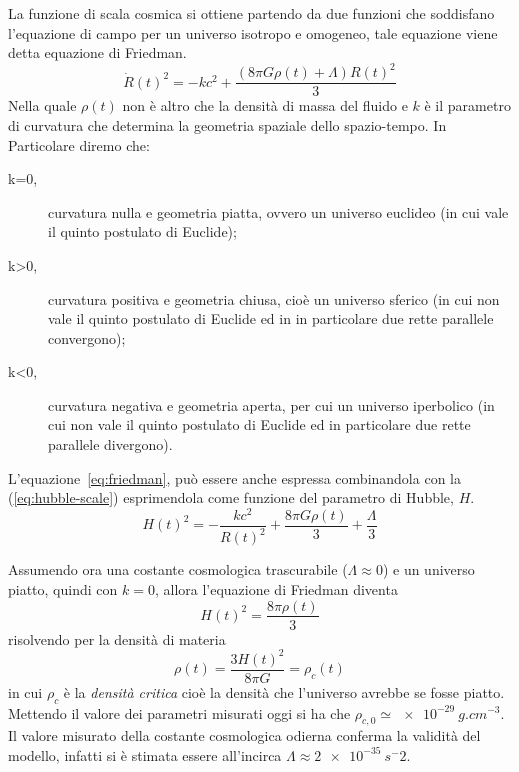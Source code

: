 La funzione di scala cosmica si ottiene partendo da due funzioni che soddisfano l'equazione di campo per un universo isotropo e omogeneo, tale equazione viene detta equazione di Friedman.
\begin{equation}\label{eq:friedman}
    \dot{R}(t)^2 = -kc^2 + \frac{(8 \pi G \rho(t)+\Lambda) R(t)^2}{3}
\end{equation}
Nella quale $\rho(t)$ non è altro che la densità di massa del fluido e $k$ è il parametro di curvatura che determina la geometria spaziale dello spazio-tempo. In Particolare diremo che:
\begin{description}
    \item[k=0,] curvatura nulla e geometria piatta, ovvero un universo euclideo (in cui vale il quinto postulato di Euclide);
    \item[k>0,] curvatura positiva e geometria chiusa, cioè un universo sferico (in cui non vale il quinto postulato di Euclide ed in in particolare due rette parallele convergono);
    \item[k<0,] curvatura negativa e geometria aperta, per cui un universo iperbolico  (in cui non vale il quinto postulato di Euclide ed in particolare due rette parallele divergono).
\end{description}

L'equazione~\ref{eq:friedman}, può essere anche espressa combinandola con la (\ref{eq:hubble-scale}) esprimendola come funzione del parametro di Hubble, $H$.
\begin{equation}\label{eq:friedman-hubble}
    H(t)^2 = - \frac{kc^2}{R(t)^2} + \frac{8\pi G \rho (t)}{3} + \frac{\Lambda}{3}
\end{equation}

Assumendo ora una costante cosmologica trascurabile ($\Lambda \approx 0$) e un universo piatto, quindi con $k = 0$, allora l'equazione di Friedman diventa
\[
    H(t)^2 = \frac{8 \pi \rho (t)}{3}
\]
risolvendo per la densità di materia
\[
    \rho (t) = \frac{3 H(t)^2}{8 \pi G} = \rho_c (t)
\]
in cui $\rho_c$ è la \textit{densità critica} cioè la densità che l'universo avrebbe se fosse piatto. Mettendo il valore dei parametri misurati oggi si ha che $\rho_{c,0} \simeq \SI{e-29}{g.cm^{-3}}$. Il valore misurato della costante cosmologica odierna conferma la validità del modello, infatti si è stimata essere all'incirca $\Lambda \approx \SI{2e-35}{s^-2}$.

